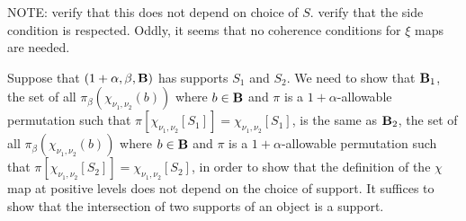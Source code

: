\documentclass[12pt]{article}
\begin{document}
NOTE:  verify that this does not depend on choice of $S$.  verify that the side condition is respected.  Oddly, it seems that no coherence conditions for $\xi$ maps are needed.

Suppose that $(1+\alpha,\beta,{\bf B})$ has supports $S_1$ and $S_2$.   We need to show that ${\bf B}_1$, the set of all $\pi_\beta(\chi_{\nu_1,\nu_2}(b))$ where $b \in {\bf B}$ and $\pi$ is a $1+\alpha$-allowable permutation such that $\pi[\chi_{\nu_1,\nu_2}[S_1]] = \chi_{\nu_1,\nu_2}[S_1]$, is the same as ${\bf B}_2$, the set of all $\pi_\beta(\chi_{\nu_1,\nu_2}(b))$ where $b \in {\bf B}$ and $\pi$ is a $1+\alpha$-allowable permutation such that $\pi[\chi_{\nu_1,\nu_2}[S_2]] = \chi_{\nu_1,\nu_2}[S_2]$, in order to show that the definition of the $\chi$ map at positive levels does not depend on the choice of support.    It suffices to show that the intersection of two supports of an object is a support.
\end{document}
